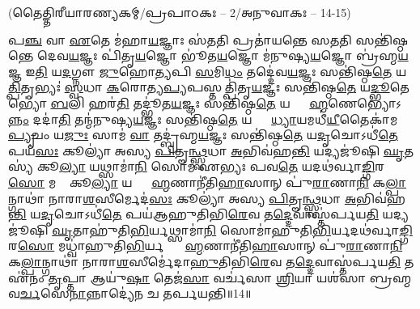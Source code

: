 \vspace{-1ex}
\centerline{\normalsize(𑌤𑍈𑌤𑍍𑌤𑌿𑌰𑍀𑌯𑌾𑌰𑌣𑍍𑌯𑌕𑌮𑍍/𑌪𑍍𑌰𑌪𑌾𑌠𑌕𑌃 – 2/𑌅𑌨𑍁𑌵𑌾𑌕𑌃 – 14-15)}
{\normalsize
𑌪\ul{𑌞𑍍𑌚} 𑌵𑌾 \ul{𑌏}𑌤𑍇 𑌮॑𑌹𑌾\ul{𑌯}𑌜𑍍𑌞𑌾𑌃 𑌸॑\ul{𑌤}𑌤𑌿 𑌪𑍍𑌰𑌤𑌾॑𑌯𑌨𑍍𑌤𑍇 𑌸\ul{𑌤}𑌤𑌿 𑌸𑌨𑍍𑌤𑌿॑𑌷𑍍𑌠𑌨𑍍𑌤𑍇 𑌦𑍇𑌵\ul{𑌯}𑌜𑍍𑌞𑌃 𑌪𑌿॑𑌤𑍃\ul{𑌯}𑌜𑍍𑌞𑍋 𑌭𑍂॑𑌤\ul{𑌯}𑌜𑍍𑌞𑍋 𑌮॑𑌨𑍁𑌷𑍍𑌯\ul{𑌯}𑌜𑍍𑌞𑍋 𑌬𑍍𑌰॑𑌹𑍍𑌮\ul{𑌯}𑌜𑍍𑌞 𑌇\ul{𑌤𑌿} 𑌯\ul{𑌦}𑌗𑍍𑌨𑍗 \ul{𑌜𑍁}𑌹𑍋\ul{𑌤𑍍𑌯}𑌪𑌿 \ul{𑌸}𑌮𑌿\ul{𑌧𑌂} 𑌤𑌦𑍍𑌦𑍇॑𑌵\ul{𑌯}𑌜𑍍𑌞𑌃 𑌸𑌨𑍍𑌤𑌿॑𑌷𑍍𑌠\ul{𑌤𑍇} 𑌯\ul{𑌤𑍍𑌪𑌿}𑌤𑍃𑌭𑍍𑌯𑌃॑ \ul{𑌸𑍍𑌵}𑌧𑌾 \ul{𑌕}𑌰𑍋𑌤𑍍𑌯\ul{𑌪𑍍𑌯}𑌪𑌸𑍍𑌤𑌤𑍍𑌪𑌿॑𑌤𑍃\ul{𑌯}𑌜𑍍𑌞𑌃 𑌸𑌨𑍍𑌤𑌿॑𑌷𑍍𑌠\ul{𑌤𑍇} 𑌯\ul{𑌦𑍍𑌭𑍂}𑌤𑍇𑌭𑍍𑌯𑍋॑ \ul{𑌬}𑌲𑌿 𑌹𑌰॑\ul{𑌤𑌿} 𑌤𑌦𑍍𑌭𑍂॑𑌤\ul{𑌯}𑌜𑍍𑌞𑌃 𑌸𑌨𑍍𑌤𑌿॑𑌷𑍍𑌠\ul{𑌤𑍇} 𑌯𑌦𑍍𑌬𑍍𑌰𑌾᳚\ul{𑌹𑍍𑌮}𑌣𑍇𑌭𑍍𑌯𑍋𑌽\ul{𑌨𑍍𑌨𑌂} 𑌦𑌦𑌾॑\ul{𑌤𑌿} 𑌤𑌨𑍍𑌮॑𑌨𑍁𑌷𑍍𑌯\ul{𑌯}𑌜𑍍𑌞𑌃 𑌸𑌨𑍍𑌤𑌿॑𑌷𑍍𑌠\ul{𑌤𑍇} 𑌯𑌥𑍍𑌸𑍍𑌵𑌾᳚\ul{𑌧𑍍𑌯𑌾}𑌯𑌮𑌧𑍀॑\ul{𑌯𑍀}𑌤𑍈𑌕𑌾॑𑌮\ul{𑌪𑍍𑌯𑍃}𑌚𑌂 𑌯\ul{𑌜𑍁𑌃} 𑌸𑌾𑌮॑ \ul{𑌵𑌾} 𑌤𑌦𑍍𑌬𑍍𑌰॑𑌹𑍍𑌮\ul{𑌯}𑌜𑍍𑌞𑌃 𑌸𑌨𑍍𑌤𑌿॑𑌷𑍍𑌠\ul{𑌤𑍇} 𑌯\ul{𑌦𑍃}𑌚𑍋𑌽𑌧𑍀॑\ul{𑌤𑍇} 𑌪𑌯॑\ul{𑌸𑌃} 𑌕𑍂𑌲𑍍𑌯𑌾॑ 𑌅𑌸𑍍𑌯 \ul{𑌪𑌿}𑌤𑍄\ul{𑌨𑍍𑌥𑍍𑌸𑍍𑌵}𑌧𑌾 \ul{𑌅}𑌭𑌿𑌵॑𑌹\ul{𑌨𑍍𑌤𑌿} 𑌯𑌦𑍍𑌯𑌜𑍂॑𑌷𑌿 \ul{𑌘𑍃}𑌤𑌸𑍍𑌯॑ 𑌕𑍂\ul{𑌲𑍍𑌯𑌾} 𑌯𑌥𑍍𑌸𑌾𑌮𑌾॑\ul{𑌨𑌿} 𑌸𑍋𑌮॑ 𑌏𑌭𑍍𑌯𑌃 𑌪𑌵\ul{𑌤𑍇} 𑌯𑌦𑌥॑𑌰𑍍𑌵𑌾\ul{𑌙𑍍𑌗𑌿}𑌰\ul{𑌸𑍋} 𑌮𑌧𑍋𑌃᳚ 𑌕𑍂\ul{𑌲𑍍𑌯𑌾} 𑌯𑌦𑍍𑌬𑍍𑌰𑌾᳚\ul{𑌹𑍍𑌮}𑌣𑌾𑌨𑍀॑𑌤𑌿\ul{𑌹𑌾}𑌸𑌾𑌨𑍍 𑌪𑍁॑\ul{𑌰𑌾}𑌣𑌾\ul{𑌨𑌿} 𑌕\ul{𑌲𑍍𑌪𑌾}𑌨𑍍𑌗𑌾𑌥𑌾॑ 𑌨𑌾𑌰𑌾\ul{𑌶}\ul{}𑌸𑍀𑌰𑍍𑌮𑍇𑌦॑\ul{𑌸𑌃} 𑌕𑍂𑌲𑍍𑌯𑌾॑ 𑌅𑌸𑍍𑌯 \ul{𑌪𑌿}𑌤𑍄\ul{𑌨𑍍𑌥𑍍𑌸𑍍𑌵}𑌧𑌾 \ul{𑌅}𑌭𑌿𑌵॑𑌹\ul{𑌨𑍍𑌤𑌿} 𑌯\ul{𑌦𑍃}𑌚𑍋𑌽𑌧𑍀॑\ul{𑌤𑍇} 𑌪𑌯॑𑌆𑌹𑍁𑌤𑌿𑌭𑌿\ul{𑌰𑍇}𑌵 𑌤\ul{𑌦𑍍𑌦𑍇}𑌵𑌾𑌸𑍍𑌤॑𑌰𑍍𑌪𑌯\ul{𑌤𑌿} 𑌯𑌦𑍍𑌯𑌜𑍂॑𑌷𑌿 \ul{𑌘𑍃}𑌤𑌾𑌹𑍁॑𑌤𑌿\ul{𑌭𑌿}𑌰𑍍𑌯𑌥𑍍𑌸𑌾𑌮𑌾॑\ul{𑌨𑌿} 𑌸𑍋𑌮𑌾॑𑌹𑍁𑌤𑌿\ul{𑌭𑌿}𑌰𑍍𑌯𑌦𑌥॑𑌰𑍍𑌵𑌾\ul{𑌙𑍍𑌗𑌿}𑌰\ul{𑌸𑍋} 𑌮𑌧𑍍𑌵𑌾॑\-𑌹𑍁𑌤𑌿\ul{𑌭𑌿}𑌰𑍍𑌯𑌦𑍍𑌬𑍍𑌰𑌾᳚\ul{𑌹𑍍𑌮}𑌣𑌾𑌨𑍀॑𑌤𑌿\ul{𑌹𑌾}𑌸𑌾𑌨𑍍 𑌪𑍁॑\ul{𑌰𑌾}𑌣𑌾\ul{𑌨𑌿} 𑌕\ul{𑌲𑍍𑌪𑌾}𑌨𑍍𑌗𑌾𑌥𑌾॑ 𑌨𑌾𑌰𑌾\ul{𑌶}\ul{}𑌸𑍀𑌰𑍍𑌮𑍇॑𑌦𑌾\ul{𑌹𑍁}𑌤𑌿𑌭𑌿॑\ul{𑌰𑍇}𑌵 𑌤\ul{𑌦𑍍𑌦𑍇}𑌵𑌾𑌸𑍍𑌤॑𑌰𑍍𑌪𑌯\ul{𑌤𑌿} 𑌤 𑌏॑𑌨𑌂 \ul{𑌤𑍃}𑌪𑍍𑌤𑌾 𑌆𑌯𑍁॑\ul{𑌷𑌾} 𑌤𑍇𑌜॑\ul{𑌸𑌾} 𑌵𑌰𑍍𑌚॑𑌸𑌾 \ul{𑌶𑍍𑌰𑌿}𑌯𑌾 𑌯𑌶॑𑌸𑌾 𑌬𑍍𑌰𑌹𑍍𑌮𑌵\ul{𑌰𑍍𑌚}𑌸𑍇\ul{𑌨𑌾}𑌨𑍍𑌨𑌾𑌦𑍍𑌯𑍇॑𑌨 𑌚 𑌤𑌰𑍍𑌪𑌯𑌨𑍍𑌤𑌿॥14॥

}
